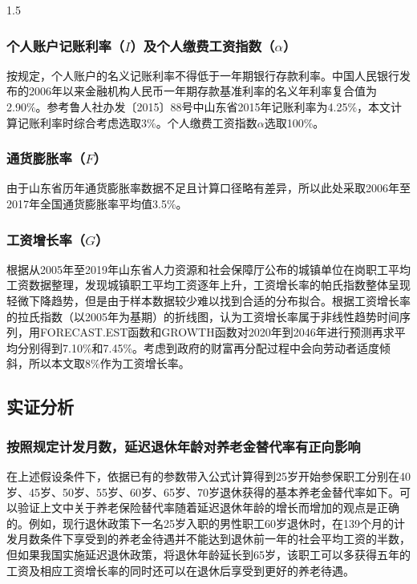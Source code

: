\documentclass[a4paper,12pt]{ctexart}
\numberwithin{equation}{section}
\begin{document}
\begin{spacing}{1.5}
\subsubsection{个人账户记账利率（$I$）及个人缴费工资指数（$\alpha$）}

按规定，个人账户的名义记账利率不得低于一年期银行存款利率。中国人民银行发布的2006年以来金融机构人民币一年期存款基准利率的名义年利率复合值为2.90\%。参考鲁人社办发〔2015〕88号中山东省2015年记账利率为4.25\%，本文计算记账利率时综合考虑选取3\%。个人缴费工资指数$\alpha$选取100\%。

\subsubsection{通货膨胀率（$F$）}

由于山东省历年通货膨胀率数据不足且计算口径略有差异，所以此处采取2006年至2017年全国通货膨胀率平均值3.5\%。

\subsubsection{工资增长率（$G$）}

根据从2005年至2019年山东省人力资源和社会保障厅公布的城镇单位在岗职工平均工资数据整理，发现城镇职工平均工资逐年上升，工资增长率的帕氏指数整体呈现轻微下降趋势，但是由于样本数据较少难以找到合适的分布拟合。根据工资增长率的拉氏指数（以2005年为基期）的折线图，认为工资增长率属于非线性趋势时间序列，用FORECAST.EST函数和GROWTH函数对2020年到2046年进行预测再求平均分别得到7.10\%和7.45\%。考虑到政府的财富再分配过程中会向劳动者适度倾斜，所以本文取8\%作为工资增长率。

\subsection{实证分析}

\subsubsection{按照规定计发月数，延迟退休年龄对养老金替代率有正向影响}

在上述假设条件下，依据已有的参数带入公式计算得到25岁开始参保职工分别在40岁、45岁、50岁、55岁、60岁、65岁、70岁退休获得的基本养老金替代率如下。可以验证上文中关于养老保险替代率随着延迟退休年龄的增长而增加的观点是正确的。例如，现行退休政策下一名25岁入职的男性职工60岁退休时，在139个月的计发月数条件下享受到的养老金待遇并不能达到退休前一年的社会平均工资的半数，但如果我国实施延迟退休政策，将退休年龄延长到65岁，该职工可以多获得五年的工资及相应工资增长率的同时还可以在退休后享受到更好的养老待遇。


\end{spacing}
\end{document}
